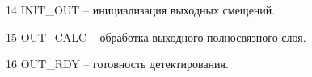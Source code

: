   14 {INIT\_OUT} – инициализация выходных смещений.

  15 {OUT\_CALC} – обработка выходного полносвязного слоя.

  16 {OUT\_RDY} – готовность детектирования.


